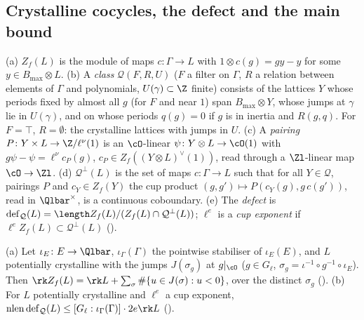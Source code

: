 \subsection{Crystalline cocycles, the defect and the main bound}\label{cg-lifting:sec:defect}

\begin{definition}\label{cg-lifting:def:defect}
(a) $Z_f(L)$ is the module of maps $c\colon\Gamma\to L$ with $1\otimes c(g)=gy-y$ for some
$y\in B_{\max}\otimes L$.
(b) A \emph{class} $\mathcal Q(F,R,U)$ ($F$ a filter on $\Gamma$, $R$ a relation between elements of
$\Gamma$ and polynomials, $U(\gamma)\subset\Z$ finite) consists of the lattices $Y$ whose periods
fixed by almost all $g$ (for $F$ and near $1$) span $B_{\max}\otimes Y$, whose jumps at $\gamma$ lie in
$U(\gamma)$, and on whose periods $q(g)=0$ if $g$ is in inertia and $R(g,q)$. For $F=\top$,
$R=\emptyset$: the crystalline lattices with jumps in $U$.
(c) A \emph{pairing} $P\colon Y\times L\to\Z/\ell^\nu(1)$ is an $\cO$-linear
$\psi\colon Y\otimes L\to\cO(1)$ with $g\psi-\psi=\ell^\nu c_P(g)$, $c_P\in Z_f((Y\otimes L)^\vee(1))$,
read through a $\Zl$-linear map $\cO\to\Zl$.
(d) $\mathcal Q^\perp(L)$ is the set of maps $c\colon\Gamma\to L$ such that for all $Y\in\mathcal Q$,
pairings $P$ and $c_Y\in Z_f(Y)$ the cup product $(g,g')\mapsto P(c_Y(g),g\,c(g'))$, read in
$\Qlbar^\times$, is a continuous coboundary.
(e) The \emph{defect} is $\operatorname{def}_{\mathcal Q}(L)=\length Z_f(L)/(Z_f(L)\cap\mathcal
Q^\perp(L))$; $\ell^e$ is a \emph{cup exponent} if $\ell^eZ_f(L)\subset\mathcal Q^\perp(L)$
().
\end{definition}

\begin{lemma}\label{cg-lifting:lem:rank}
(a) Let $\iota_E\colon E\to\Qlbar$, $\iota_\Gamma(\Gamma)$ the pointwise stabiliser of $\iota_E(E)$, and $L$ potentially crystalline with the jumps $J(\sigma_g)$ at $g|_\cO$
($g\in G_\ell$, $\sigma_g=\iota^{-1}\circ g^{-1}\circ\iota_E$). Then $\rk Z_f(L)=\rk L+\sum_\sigma\#\{u\in J(\sigma):u<0\}$,
over the distinct $\sigma_g$
().
(b) For $L$ potentially crystalline and $\ell^e$ a cup exponent,
$\operatorname{nlen}\operatorname{def}_{\mathcal Q}(L)\le[G_\ell:\iota_\Gamma(\Gamma)]\cdot2e\rk L$
().
\end{lemma}

